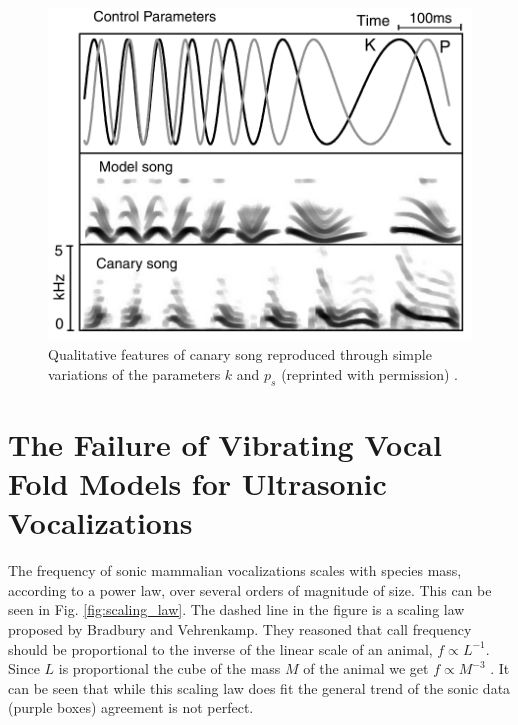 \documentclass[12pt, letter]{report}
\begin{document}
\begin{figure}
\centering
\includegraphics[width=0.5\linewidth]{magnasco_bird_song.png}
\caption{Qualitative features of canary song reproduced through simple variations of the parameters $k$ and $p_s$ (reprinted with permission) \cite{Gardner2001}.}
\label{fig:magnasco_hopf}
\end{figure}
\section{The Failure of Vibrating Vocal Fold Models for Ultrasonic Vocalizations}
The frequency of sonic mammalian vocalizations scales with species mass, according to a power law, over several orders of magnitude of size. This can be seen in Fig. \ref{fig:scaling_law}. The dashed line in the figure is a scaling law proposed by Bradbury and Vehrenkamp. They reasoned that call frequency should be proportional to the inverse of the linear scale of an animal, $f\propto L^{-1}$. Since $L$ is proportional the cube of the mass $M$ of the animal we get $f\propto M^{-3}$ \cite{bradbury1998principles}. It can be seen that while this scaling law does fit the general trend of the sonic data (purple boxes) agreement is not perfect.
\end{document}
